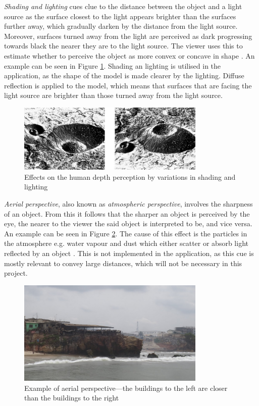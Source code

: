 \textit{Shading and lighting} cues clue to the distance between the object and a light source as the surface closest to the light appears brighter than the surfaces further away, which gradually darken by the distance from the light source. Moreover, surfaces turned away from the light are perceived as dark progressing towards black the nearer they are to the light source. The viewer uses this to estimate whether to perceive the object as more convex or concave in shape \cite{Gale}. An example can be seen in Figure \ref{fig:cue1}. Shading an lighting is utilised in the application, as the shape of the model is made clearer by the lighting. Diffuse reflection is applied to the model, which means that surfaces that are facing the light source are brighter than those turned away from the light source.

\begin{figure}[h!]
   \centering
   \includegraphics[width=0.8\textwidth]{figures/cue1.jpg}
   \caption{Effects on the human depth perception by variations in shading and lighting \cite{Heeger}}\label{fig:cue1}
\end{figure}

\textit{Aerial perspective}, also known as \textit{atmospheric perspective},  involves the sharpness of an object. From this it follows that the sharper an object is perceived by the eye, the nearer to the viewer the said object is interpreted to be, and vice versa. An example can be seen in Figure \ref{fig:cue2}. The cause of this effect is the particles in the atmosphere e.g. water vapour and dust which either scatter or absorb light reflected by an object \cite{Gale}. This is not implemented in the application, as this cue is mostly relevant to convey large distances, which will not be necessary in this project.

\begin{figure}[h!]
   \centering
   \includegraphics[width=0.8\textwidth]{figures/cue2.jpg}
   \caption{Example of aerial perspective---the buildings to the left are closer than the buildings to the right}\label{fig:cue2}
\end{figure}

